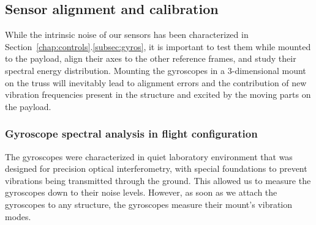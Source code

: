 \subsection{Sensor alignment and calibration}
While the intrinsic noise of our sensors has been characterized in Section~\ref{chap:controls}.\ref{subsec:gyros}, it is important to test them while mounted to the payload, align their axes to the other reference frames, and study their spectral energy distribution. Mounting the gyroscopes in a 3-dimensional mount on the truss will inevitably lead to alignment errors and the contribution of new vibration frequencies present in the structure and excited by the moving parts on the payload.


\subsubsection{Gyroscope spectral analysis in flight configuration}

The gyroscopes were characterized in quiet laboratory environment that was designed for precision optical interferometry, with special foundations to prevent vibrations being transmitted through the ground. This allowed us to measure the gyroscopes down to their noise levels. However, as soon as we attach the gyroscopes to any structure, the gyroscopes measure their mount's vibration modes. 



